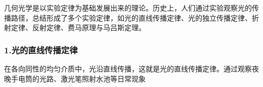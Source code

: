 

几何光学是以实验定律为基础发展出来的理论。历史上，人们通过实验观察光的传播路径，总结形成了多个实验定律，如光的直线传播定律、光的独立传播定律、折射定律、反射定律、费马原理与马吕斯定理。

\subsubsection{1.光的直线传播定律}

在各向同性的均匀介质中，光沿直线传播，这就是光的直线传播定律。通过观察夜晚手电筒的光路、激光笔照射水池等日常现象
